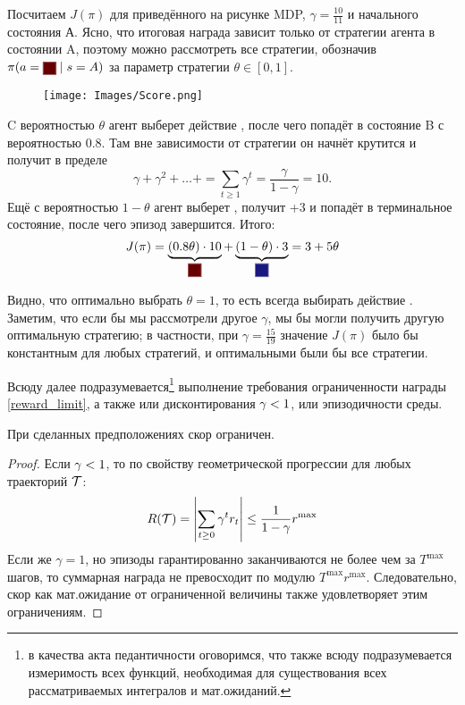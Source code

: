 \begin{exampleBox}[label=ex:score]{}
Посчитаем $J(\pi)$ для приведённого на рисунке MDP, $\gamma = \frac{10}{11}$ и начального состояния А. Ясно, что итоговая награда зависит только от стратегии агента в состоянии A, поэтому можно рассмотреть все стратегии, обозначив $\pi(a = \text{\colorsquare{ChadRed}} \mid s = A)$ за параметр стратегии $\theta \in [0, 1]$.

\begin{wrapfigure}{r}{0.3\textwidth}
\centering
\texttt{[image: Images/Score.png]}
\vspace{-1cm}
\end{wrapfigure}

C вероятностью $\theta$ агент выберет действие , после чего попадёт в состояние B с вероятностью 0.8. Там вне зависимости от стратегии он начнёт крутится и получит в пределе
$$\gamma + \gamma^2 + \dots + = \sum\limits_{t \ge 1} \gamma^t = \frac{\gamma}{1 - \gamma} = 10.$$
Ещё с вероятностью $1 - \theta$ агент выберет , получит +3 и попадёт в терминальное состояние, после чего эпизод завершится. Итого:
$$J(\pi) = \underbrace{\left( 0.8\theta \right) \cdot 10}_{\text{\colorsquare{ChadRed}}} + \underbrace{\left(1 - \theta \right) \cdot 3}_{\text{\colorsquare{ChadBlue}}} = 3 + 5\theta$$

Видно, что оптимально выбрать $\theta = 1$, то есть всегда выбирать действие . Заметим, что если бы мы рассмотрели другое $\gamma$, мы бы могли получить другую оптимальную стратегию; в частности, при $\gamma = \frac{15}{19}$ значение $J(\pi)$ было бы константным для любых стратегий, и оптимальными были бы все стратегии. 
\end{exampleBox}

Всюду далее подразумевается\footnote{в качества акта педантичности оговоримся, что также всюду подразумевается измеримость всех функций, необходимая для существования всех рассматриваемых интегралов и мат.ожиданий.} выполнение требования ограниченности награды \eqref{reward_limit}, а также или дисконтирования $\gamma \HM< 1$, или эпизодичности среды.

\begin{proposition}
При сделанных предположениях скор ограничен.
\begin{proof}
Если $\gamma \HM< 1$, то по свойству геометрической прогрессии для любых траекторий $\mathcal{T}$:
\begin{equation*}
R(\mathcal{T}) = \left| \sum_{t \ge 0} \gamma^t r_t \right| \le \frac{1}{1 - \gamma} r^{\max}
\end{equation*}
Если же $\gamma = 1$, но эпизоды гарантированно заканчиваются не более чем за $T^{\max}$ шагов, то суммарная награда не превосходит по модулю $T^{\max} r^{\max}$. Следовательно, скор как мат.ожидание от ограниченной величины также удовлетворяет этим ограничениям.
\end{proof}
\end{proposition}